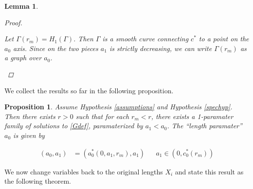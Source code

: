 \documentclass[12pt]{article}
\newtheorem{lemma}{Lemma}
\newtheorem{proposition}{Proposition}
\begin{document}
\begin{lemma}
\begin{proof}
\begin{enumerate}
Let $\Gamma(r_m) = H_1(\Gamma)$. Then $\Gamma$ is a smooth curve connecting $c^*$ to a point on the $a_0$ axis. Since on the two pieces $a_1$ is strictly decreasing, we can write $\Gamma(r_m)$ as a graph over $a_0$.

\end{enumerate}
\end{proof}
\end{lemma}


We collect the results so far in the following proposition.


\begin{proposition}\label{2pera}
Assume Hypothesis \ref{assumptions} and Hypothesis \ref{spechyp}. Then there exists $r > 0$ such that for each $r_m < r$, there exists a 1-paramater family of solutions to \eqref{Gdef}, paramaterized by $a_1 < a_0$. The ``length paramater'' $a_0$ is given by

\begin{align}
(a_0, a_1) &= ( a_0^*(0, a_1, r_m), a_1 ) && a_1 \in (0, c_0^*(r_m))
\end{align}

\end{proposition}

We now change variables back to the original lengths $X_i$ and state this result as the following theorem.

\end{document}
